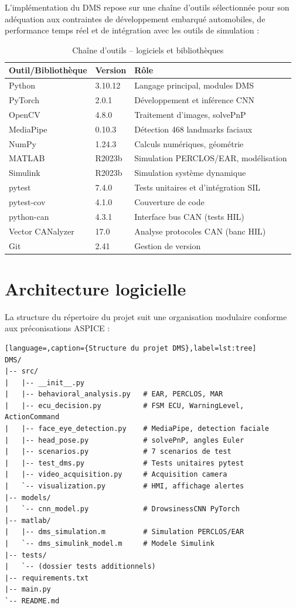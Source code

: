\documentclass[12pt,a4paper]{report}
\begin{document}
L'impl\'ementation du DMS repose sur une cha\^ine d'outils s\'electionn\'ee pour son ad\'equation aux contraintes de d\'eveloppement embarqu\'e automobiles, de performance temps r\'eel et de int\'egration avec les outils de simulation :

\begin{table}[H]
\centering
\caption{Cha\^ine d'outils -- logiciels et biblioth\`eques}
\label{tab:toolchain}
\begin{tabular}{L{3.5cm} L{4cm} L{5cm}}
\toprule
\textbf{Outil/Biblioth\`eque} & \textbf{Version} & \textbf{R\^ole} \\
\midrule
Python & 3.10.12 & Langage principal, modules DMS \\
PyTorch & 2.0.1 & D\'eveloppement et inf\'erence CNN \\
OpenCV & 4.8.0 & Traitement d'images, solvePnP \\
MediaPipe & 0.10.3 & D\'etection 468 landmarks faciaux \\
NumPy & 1.24.3 & Calculs num\'eriques, g\'eom\'etrie \\
MATLAB & R2023b & Simulation PERCLOS/EAR, mod\'elisation \\
Simulink & R2023b & Simulation syst\`eme dynamique \\
pytest & 7.4.0 & Tests unitaires et d'int\'egration SIL \\
pytest-cov & 4.1.0 & Couverture de code \\
python-can & 4.3.1 & Interface bus CAN (tests HIL) \\
Vector CANalyzer & 17.0 & Analyse protocoles CAN (banc HIL) \\
Git & 2.41 & Gestion de version \\
\bottomrule
\end{tabular}
\end{table}

\section{Architecture logicielle}

La structure du r\'epertoire du projet suit une organisation modulaire conforme aux pr\'econisations ASPICE :

\begin{lstlisting}[language=,caption={Structure du projet DMS},label=lst:tree]
DMS/
|-- src/
|   |-- __init__.py
|   |-- behavioral_analysis.py   # EAR, PERCLOS, MAR
|   |-- ecu_decision.py          # FSM ECU, WarningLevel, ActionCommand
|   |-- face_eye_detection.py    # MediaPipe, detection faciale
|   |-- head_pose.py             # solvePnP, angles Euler
|   |-- scenarios.py             # 7 scenarios de test
|   |-- test_dms.py              # Tests unitaires pytest
|   |-- video_acquisition.py     # Acquisition camera
|   `-- visualization.py         # HMI, affichage alertes
|-- models/
|   `-- cnn_model.py             # DrowsinessCNN PyTorch
|-- matlab/
|   |-- dms_simulation.m         # Simulation PERCLOS/EAR
|   `-- dms_simulink_model.m     # Modele Simulink
|-- tests/
|   `-- (dossier tests additionnels)
|-- requirements.txt
|-- main.py
`-- README.md
\end{lstlisting}
\end{document}
